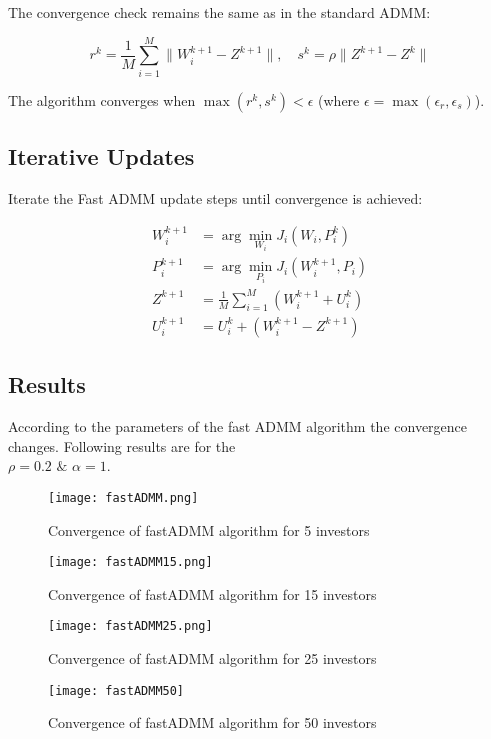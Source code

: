 \documentclass{article}
\begin{document}
	The convergence check remains the same as in the standard ADMM:
	
	\[
	r^k = \frac{1}{M} \sum_{i=1}^{M} \|W_i^{k+1} - Z^{k+1}\|, \quad s^k = \rho \|Z^{k+1} - Z^k\|
	\]
	
	The algorithm converges when $\max(r^k, s^k) < \epsilon$ (where $\epsilon = \max(\epsilon_r, \epsilon_s)$).
	
	\subsection*{Iterative Updates}
	
	Iterate the Fast ADMM update steps until convergence is achieved:
	
	\[
	\begin{aligned}
		W_i^{k+1} & = \arg\min_{W_i} J_i(W_i, P_i^k) \\
		P_i^{k+1} & = \arg\min_{P_i} J_i(W_i^{k+1}, P_i) \\
		Z^{k+1} & = \frac{1}{M} \sum_{i=1}^{M} (W_i^{k+1} + U_i^k) \\
		U_i^{k+1} & = U_i^k + (W_i^{k+1} - Z^{k+1})
	\end{aligned}
	\]
	\pagebreak
	\subsection{Results}
	
	According to the parameters of the fast ADMM algorithm the convergence changes.
	Following results are for the\\ $\rho = 0.2$ $\&$ $\alpha = 1.$
			
		\begin{figure}[h]
			\begin{minipage}{0.49\linewidth}
				\centering
				\texttt{[image: fastADMM.png]}
				\caption{Convergence of fastADMM algorithm for 5 investors}
			\end{minipage}
			\begin{minipage}{0.49\linewidth}
				\centering
				\texttt{[image: fastADMM15.png]}
				\caption{Convergence of fastADMM algorithm for 15 investors}
			\end{minipage}
			\label{figx}
		\end{figure}
		\begin{figure}[h]
		\begin{minipage}{0.49\linewidth}
			\centering
			\texttt{[image: fastADMM25.png]}
			\caption{Convergence of fastADMM algorithm for 25 investors}
		\end{minipage}
		\begin{minipage}{0.49\linewidth}
			\centering
			\texttt{[image: fastADMM50]}
			\caption{Convergence of fastADMM algorithm for 50 investors}
		\end{minipage}
		\label{figy}
	\end{figure}
	
\end{document}
